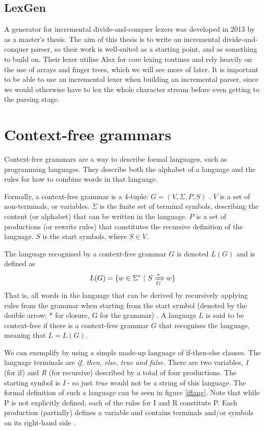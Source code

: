 \documentclass[a4paper,12pt,twosided]{report}
\renewcommand\cite{\citep}
\begin{document}
\subsection{LexGen}
A generator for incremental divide-and-conquer lexers was developed in 2013 by
\citet{divconqlex} as a master's thesis. The aim of this thesis is to write an
incremental divide-and-conquer parser, so their work is well-suited as a
starting point, and as something to build on. Their lexer utilise Alex
\cite{alex} for core lexing routines and rely heavily on the use of arrays and
finger trees, which we will see more of later. It is important to be able to use
an incremental lexer when building an incremental parser, since we would
otherwise have to lex the whole character stream before even getting to the
parsing stage.

\section{Context-free grammars}
Context-free grammars are a way to describe formal languages, such as
programming languages. They describe both the alphabet of a language and the
rules for how to combine words in that language.

Formally, a context-free grammar is a 4-tuple: $G = (V, \Sigma, P, S)$
\cite[p.171]{automatabook}. $V$ is a set of non-terminals, or variables. $\Sigma$ is
the finite set of terminal symbols, describing the content (or alphabet) that
can be written in the language. $P$ is a set of productions (or rewrite rules)
that constitutes the recursive definition of the language. $S$ is the start
symbols, where $S \in V$. 

The language recognised by a context-free grammar $G$ is denoted $L(G)$ and is
defined as 
\[
L(G) = \{w \in \Sigma^* \ |\  S \xRightarrow[G]{*} w\}
\]
That is, all words in the language that can be derived by recursively applying
rules from the grammar when starting from the start symbol (denoted by the
double arrow; * for closure, G for the grammar) \cite[p.  177]{automatabook}. A
language $L$ is said to be context-free if there is a context-free grammar $G$
that recognises the language, meaning that $L = L(G)$.

We can exemplify by using a simple made-up language of if-then-else clauses.
The language terminals are \textit{if, then, else, true and false}.
There are two variables, \textit{I} (for if) and \textit{R} (for recursive)
described by a total of four productions. The starting symbol is \textit{I} - so
just \textit{true} would not be a string of this language. The formal
definition of such a language can be seen in figure \ref{iflang}. Note that
while P is not explicitly defined, each of the rules for I and R constitute P.
Each production (partially) defines a variable and contains terminals and/or
symbols on its right-hand side \cite[p.171]{automatabook}.
\end{document}
